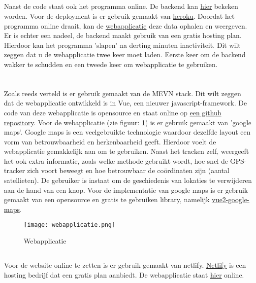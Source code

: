 \subsection{}
Naast de code staat ook het programma online. De backend kan \href{https://indy-bap-backend.herokuapp.com/api/locations}{\underline{hier}} bekeken worden. Voor de deployment is er gebruik gemaakt van \href{www.heroku.com}{heroku}. Doordat het programma online draait, kan de \href{https://indy-bap-frontend.netlify.com/}{webapplicatie} deze data ophalen en weergeven.
\newline
Er is echter een nadeel, de backend maakt gebruik van een gratis hosting plan. Hierdoor kan het programma 'slapen' na derting minuten inactiviteit. Dit wilt zeggen dat u de webapplicatie twee keer moet laden. Eerste keer om de backend wakker te schudden en een tweede keer om webapplicatie te gebruiken.
\pagebreak
\section{}
\label{ch:frontend}

\subsection{}
Zoals reeds verteld is er gebruik gemaakt van de MEVN stack. Dit wilt zeggen dat de webapplicatie ontwikkeld is in Vue, een nieuwer javascript-framework. De code van deze webapplicatie is opensource en staat online op \href{https://github.com/IndyVC/bap-frontend}{een github repository}.
\newline
Voor de webapplicatie (zie figuur: \ref{fig:webapplicatie}) is er gebruik gemaakt van 'google maps'. Google maps is een veelgebruikte technologie waardoor dezelfde layout een vorm van betrouwbaarheid en herkenbaarheid geeft. Hierdoor voelt de webapplicatie gemakkelijk aan om te gebruiken. Naast het tracken zelf, weergeeft het ook extra informatie, zoals welke methode gebruikt wordt, hoe snel de GPS-tracker zich voort beweegt en hoe betrouwbaar de coördinaten zijn (aantal satellieten). De gebruiker is instaat om de geschiedenis van lokaties te verwijderen aan de hand van een knop.
\newline
Voor de implementatie van google maps is er gebruik gemaakt van een opensource en gratis te gebruiken library, namelijk \href{https://www.npmjs.com/package/vue2-google-maps}{vue2-google-maps}.
\begin{figure}
	\texttt{[image: webapplicatie.png]}
	\caption{Webapplicatie}
	\label{fig:webapplicatie}
\end{figure}

\subsection{}
Voor de website online te zetten is er gebruik gemaakt van netlify. \href{https://www.netlify.com/}{Netlify} is een hosting bedrijf dat een gratis plan aanbiedt. De webapplicatie staat \href{https://indy-bap-frontend.netlify.com/}{\underline{hier}} online.